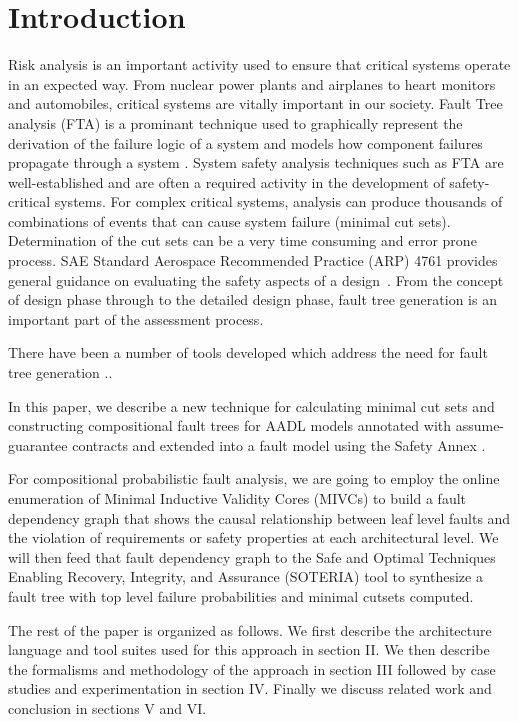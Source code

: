 \section{Introduction}
\label{sec:intro}

Risk analysis is an important activity used to ensure that critical systems operate in an expected way. From nuclear power plants and airplanes to heart monitors and automobiles, critical systems are vitally important in our society. Fault Tree analysis (FTA) is a prominant technique used to graphically represent the derivation of the failure logic of a system and models how component failures propagate through a system \cite{0f356f05e72f43018211b36f97c8854a}. System safety analysis techniques such as FTA are well-established and are often a required activity in the development of safety-critical systems. For complex critical systems, analysis can produce thousands of combinations of events that can cause system failure (minimal cut sets). Determination of the cut sets can be a very time consuming and error prone process. SAE Standard Aerospace Recommended Practice (ARP) 4761 provides general guidance on evaluating the safety aspects of a design~\cite{SAE:ARP4761}. From the concept of design phase through to the detailed design phase, fault tree generation is an important part of the assessment process.  

There have been a number of tools developed which address the need for fault tree generation .. 

In this paper, we describe a new technique for calculating minimal cut sets and constructing compositional fault trees for AADL models \cite{AADL_Standard} annotated with assume-guarantee contracts \cite{QFCS15:backes} and extended into a fault model using the Safety Annex \cite{Stewart17:IMBSA,SATechReport}. 

For compositional probabilistic fault analysis, we are going to employ the online enumeration of Minimal Inductive Validity Cores (MIVCs) \cite{GhassabaniGW16,Ghassabani2017EfficientGO} to build a fault dependency graph that shows the causal relationship between leaf level faults and the violation of requirements or safety properties at each architectural level.  We will then feed that fault dependency graph to the Safe and Optimal Techniques Enabling Recovery, Integrity, and Assurance (SOTERIA) tool \cite{SOTERIAproject} to synthesize a fault tree with top level failure probabilities and minimal cutsets computed. 

The rest of the paper is organized as follows. We first describe the architecture language and tool suites used for this approach in section II. We then describe the formalisms and methodology of the approach in section III followed by case studies and experimentation in section IV. Finally we discuss related work and conclusion in sections V and VI.  
